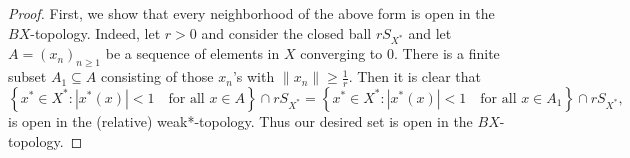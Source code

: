 \documentclass[11pt]{article}
\theoremstyle{thmstyle}
\theoremstyle{defstyle}
\renewcommand{\ge}{\geqslant}
\begin{document}
\begin{proof}
    First, we show that every neighborhood of the above form is open in the $BX$-topology. Indeed, let $r > 0$ and consider the closed ball $rS_{X^\ast}$ and let $A = (x_n)_{n\ge 1}$ be a sequence of elements in $X$ converging to $0$. There is a finite subset $A_1\subseteq A$ consisting of those $x_n$'s with $\|x_n\|\ge \frac{1}{r}$. Then it is clear that 
    \begin{equation*}
        \left\{x^\ast\in X^\ast\colon |x^\ast(x)| < 1\quad\text{for all }x\in A\right\}\cap rS_{X^\ast} = 
        \left\{x^\ast\in X^\ast\colon |x^\ast(x)| < 1\quad\text{for all }x\in A_1\right\}\cap rS_{X^\ast},
    \end{equation*}
    is open in the (relative) weak*-topology. Thus our desired set is open in the $BX$-topology.


\end{proof}
\end{document}
